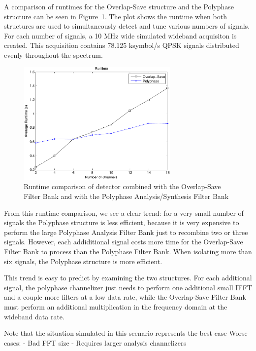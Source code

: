\documentclass[12pt]{article}
\begin{document}
A comparison of runtimes for the Overlap-Save structure and the Polyphase
structure can be seen in Figure~\ref{fig:block_diagram}. The plot shows the
runtime when both structures are used to simultaneously detect and tune various
numbers of signals. For each number of signals, a 10 MHz wide simulated
wideband acquisiton is created. This acquisition contains 78.125 ksymbol/s QPSK
signals distributed evenly throughout the spectrum.

\begin{figure}[h!]
    \begin{center}
    \includegraphics[width=0.7\textwidth]{runtime_comparison_250}%
    \end{center}
    \caption{Runtime comparison of detector combined with the Overlap-Save
             Filter Bank and with the Polyphase Analysis/Synthesis Filter Bank}
    \label{fig:block_diagram}
\end{figure}

From this runtime comparison, we see a clear trend: for a very small number of
signals the Polyphase structure is less efficient, because it is very 
expensive to perform the large Polyphase Analysis Filter Bank just to recombine
two or three signals. However, each addiditional signal costs more time for the 
Overlap-Save Filter Bank to process than the Polyphase Filter Bank. When 
isolating more than six signals, the Polyphase structure is more efficient.

This trend is easy to predict by examining the two structures. For each
additional signal, the polyphase channelizer just needs to perform one
additional small IFFT and a couple more filters at a low data rate, while the
Overlap-Save Filter Bank must perform an additional multiplication in the
frequency domain at the wideband data rate.

Note that the situation simulated in this scenario represents the best case 
Worse cases:
- Bad FFT size
- Requires larger analysis channelizers
\end{document}

